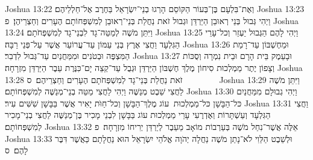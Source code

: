 Joshua 13:22	וְאֶת־בִּלְעָם בֶּן־בְּעוֹר הַקּוֹסֵם הָרְגוּ בְנֵי־יִשְׂרָאֵל בַּחֶרֶב אֶל־חַלְלֵיהֶם׃
Joshua 13:23	וַיְהִי גְּבוּל בְּנֵי רְאוּבֵן הַיַּרְדֵּן וּגְבוּל זֹאת נַחֲלַת בְּנֵי־רְאוּבֵן לְמִשְׁפְּחוֹתָם הֶעָרִים וְחַצְרֵיהֶן׃ {פ}
Joshua 13:24	וַיִּתֵּן מֹשֶׁה לְמַטֵּה־גָד לִבְנֵי־גָד לְמִשְׁפְּחֹתָם׃
Joshua 13:25	וַיְהִי לָהֶם הַגְּבוּל יַעְזֵר וְכל־עָרֵי הַגִּלְעָד וַחֲצִי אֶרֶץ בְּנֵי עַמּוֹן עַד־עֲרוֹעֵר אֲשֶׁר עַל־פְּנֵי רַבָּה׃
Joshua 13:26	וּמֵחֶשְׁבּוֹן עַד־רָמַת הַמִּצְפֶּה וּבְטֹנִים וּמִמַּחֲנַיִם עַד־גְּבוּל לִדְבִר׃
Joshua 13:27	וּבָעֵמֶק בֵּית הָרָם וּבֵית נִמְרָה וְסֻכּוֹת וְצָפוֹן יֶתֶר מַמְלְכוּת סִיחוֹן מֶלֶךְ חֶשְׁבּוֹן הַיַּרְדֵּן וּגְבֻל עַד־קְצֵה יָם־כִּנֶּרֶת עֵבֶר הַיַּרְדֵּן מִזְרָחָה׃
Joshua 13:28	זֹאת נַחֲלַת בְּנֵי־גָד לְמִשְׁפְּחֹתָם הֶעָרִים וְחַצְרֵיהֶם׃ {ס}        
Joshua 13:29	וַיִּתֵּן מֹשֶׁה לַחֲצִי שֵׁבֶט מְנַשֶּׁה וַיְהִי לַחֲצִי מַטֵּה בְנֵי־מְנַשֶּׁה לְמִשְׁפְּחוֹתָם׃
Joshua 13:30	וַיְהִי גְבוּלָם מִמַּחֲנַיִם כּל־הַבָּשָׁן כּל־מַמְלְכוּת  עוֹג מֶלֶךְ־הַבָּשָׁן וְכל־חַוֺּת יָאִיר אֲשֶׁר בַּבָּשָׁן שִׁשִּׁים עִיר׃
Joshua 13:31	וַחֲצִי הַגִּלְעָד וְעַשְׁתָּרוֹת וְאֶדְרֶעִי עָרֵי מַמְלְכוּת עוֹג בַּבָּשָׁן לִבְנֵי מָכִיר בֶּן־מְנַשֶּׁה לַחֲצִי בְנֵי־מָכִיר לְמִשְׁפְּחוֹתָם׃
Joshua 13:32	אֵלֶּה אֲשֶׁר־נִחַל מֹשֶׁה בְּעַרְבוֹת מוֹאָב מֵעֵבֶר לְיַרְדֵּן יְרִיחוֹ מִזְרָחָה׃ {פ}
Joshua 13:33	וּלְשֵׁבֶט הַלֵּוִי לֹא־נָתַן מֹשֶׁה נַחֲלָה יְהֹוָה אֱלֹהֵי יִשְׂרָאֵל הוּא נַחֲלָתָם כַּאֲשֶׁר דִּבֶּר לָהֶם׃ {ס}        
